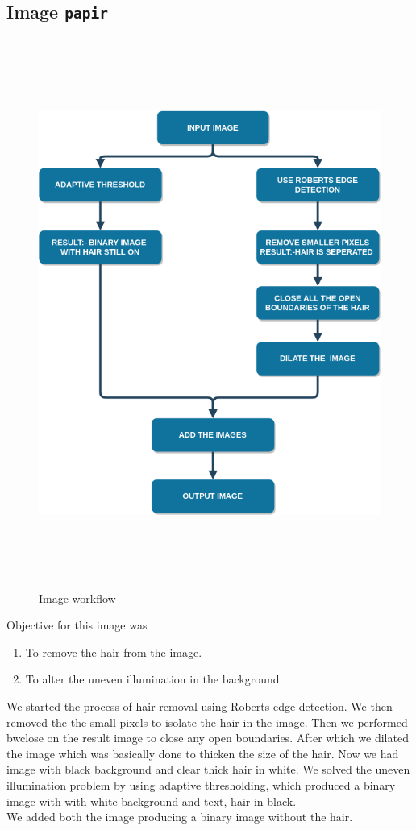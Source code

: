 \pagebreak

\subsection{Image \texttt{papir}}
\begin{figure}[h!]
  \centering
  \includegraphics[width=12cm,height=18cm,keepaspectratio]{img/papir_flow.png}
  \caption{Image  workflow}
\end{figure}
Objective for this image was
\begin{enumerate}
  \item To remove the hair from the image.
  \item To alter the uneven illumination in the background.
\end{enumerate}

We started the process of hair removal using Roberts edge detection. We then removed the the small pixels to isolate the hair in the image. Then we performed bwclose on the result image to close any open boundaries. After which we dilated the image which was basically done to thicken the size of the hair. Now we had image with black background and clear thick hair in white. We solved the uneven illumination problem by using  adaptive thresholding, which produced a binary image with with white background and text, hair in black.
\\
We added both the image producing a binary image without the hair.
